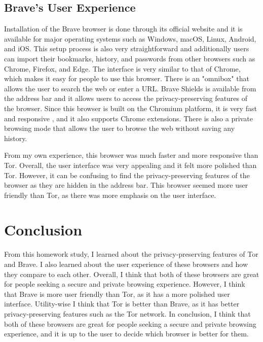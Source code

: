 \documentclass[conference]{IEEEtran}
\begin{document}
\subsection{Brave's User Experience}

Installation of the Brave browser is done through its official website and it is
available for major operating systems such as Windows, macOS, Linux, Android,
and iOS. This setup process is also very straightforward and additionally users
can import their bookmarks, history, and passwords from other browsers such as
Chrome, Firefox, and Edge. The interface is very similar to that of Chrome,
which makes it easy for people to use this browser. There is an "omnibox" that
allows the user to search the web or enter a URL. Brave Shields is available
from the address bar and it allows users to access the privacy-preserving
features of the browser. Since this browser is built on the Chromium platform,
it is very fast and responsive \cite{b6}, and it also supports Chrome 
extensions. There is also a private browsing mode that allows the user to browse
the web without saving any history.

From my own experience, this browser was much faster and more responsive 
than Tor. Overall, the user interface was very appealing and it felt more 
polished than Tor. However, it can be confusing to find the privacy-preserving 
features of the browser as they are hidden in the address bar. This browser 
seemed more user friendly than Tor, as there was more emphasis on the user 
interface.


\section{Conclusion}

From this homework study, I learned about the privacy-preserving features of
Tor and Brave. I also learned about the user experience of these browsers and
how they compare to each other. Overall, I think that both of these browsers
are great for people seeking a secure and private browsing experience. However,
I think that Brave is more user friendly than Tor, as it has a more polished
user interface. Utility-wise I think that Tor is better than Brave, as it has
better privacy-preserving features such as the Tor network. In conclusion, I
think that both of these browsers are great for people seeking a secure and
private browsing experience, and it is up to the user to decide which browser
is better for them.
\end{document}

